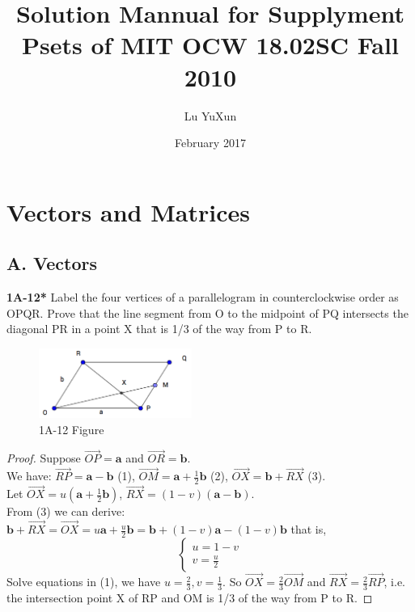 \documentclass{article}
\title{Solution Mannual for Supplyment Psets of MIT OCW 18.02SC Fall 2010}
\author{Lu YuXun}
\date{February 2017}
\begin{document}
\maketitle

\section{Vectors and Matrices}
\subsection{A. Vectors}
\textbf{1A-12*} Label the four vertices of a parallelogram in counterclockwise order as OPQR. Prove that the line segment from O to the midpoint of PQ intersects the diagonal PR in a point X that is 1/3 of the way from P to R.
\begin{figure}[htp!]
    \centering
    \includegraphics[width=50mm,scale=0.5]{Figure/1A-12.png}
    \caption{1A-12 Figure}
    \label{1A-12 Figure}
\end{figure}
\begin{proof}
Suppose $\overrightarrow{OP} = \mathbf{a}$ and $\overrightarrow{OR} = \mathbf{b}$.
\\ We have: $\overrightarrow{RP} = \mathbf{a} - \mathbf{b}$ (1), $\overrightarrow{OM} = \mathbf{a} + \frac{1}{2} \mathbf{b}$ (2), $\overrightarrow{OX} = \mathbf{b} + \overrightarrow{RX}$ (3).
\\Let $\overrightarrow{OX} = u(\mathbf{a} + \frac{1}{2}\mathbf{b})$, $\overrightarrow{RX} = (1 - v)(\mathbf{a} - \mathbf{b})$.
\\ From (3) we can derive:
\\ $\mathbf{b} + \overrightarrow{RX} = \overrightarrow{OX} = u\mathbf{a} + \frac{u}{2}\mathbf{b} = \mathbf{b} + (1-v)\mathbf{a} - (1-v)\mathbf{b}$
that is, 
\begin{equation}
    \begin{cases}
    u = 1 - v
    \\ v = \frac{u}{2}
    \end{cases}
\end{equation}
Solve equations in (1), we have $u = \frac{2}{3}, v = \frac{1}{3}$. So $\overrightarrow{OX} = \frac{2}{3} \overrightarrow{OM}$ and $\overrightarrow{RX} = \frac{2}{3} \overrightarrow{RP}$, i.e. the intersection point X of RP and OM is 1/3 of the way from P to R.
\end{proof}
\end{document}
